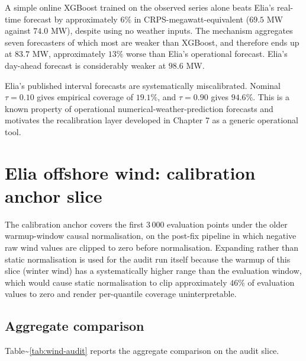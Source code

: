 \documentclass[
  11pt,
  a4paper,
  oneside]{report}
\begin{document}
A simple online XGBoost trained on the observed series alone beats
Elia's real-time forecast by approximately \(6\%\) in
CRPS-megawatt-equivalent (\(69.5\) MW against \(74.0\) MW), despite
using no weather inputs. The mechanism aggregates seven forecasters of
which most are weaker than XGBoost, and therefore ends up at \(83.7\)
MW, approximately \(13\%\) worse than Elia's operational forecast.
Elia's day-ahead forecast is considerably weaker at \(98.6\) MW.

Elia's published interval forecasts are systematically miscalibrated.
Nominal \(\tau = 0.10\) gives empirical coverage of \(19.1\%\), and
\(\tau = 0.90\) gives \(94.6\%\). This is a known property of
operational numerical-weather-prediction forecasts and motivates the
recalibration layer developed in Chapter 7 as a generic operational
tool.

\section{Elia offshore wind: calibration anchor
slice}\label{elia-offshore-wind-calibration-anchor-slice}

The calibration anchor covers the first \(3\,000\) evaluation points
under the older warmup-window causal normalisation, on the post-fix
pipeline in which negative raw wind values are clipped to zero before
normalisation. Expanding rather than static normalisation is used for
the audit run itself because the warmup of this slice (winter wind) has
a systematically higher range than the evaluation window, which would
cause static normalisation to clip approximately \(46\%\) of evaluation
values to zero and render per-quantile coverage uninterpretable.

\subsection{Aggregate comparison}\label{aggregate-comparison-1}

Table\textasciitilde{}\ref{tab:wind-audit} reports the aggregate
comparison on the audit slice.
\end{document}
